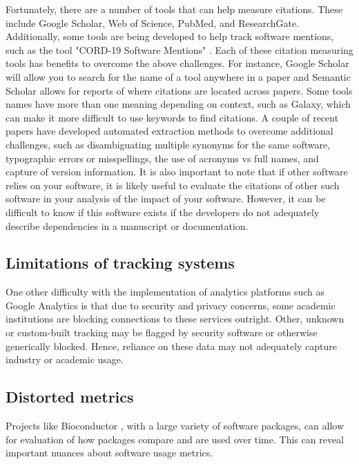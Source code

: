 \documentclass{article}
\begin{document}
Fortunately, there are a number of tools that can help measure citations. These include Google Scholar, Web of Science, PubMed, and ResearchGate. Additionally, some tools are being developed to help track software mentions, such as the tool "CORD-19 Software Mentions" \cite{wade_cord-19_2021}. Each of these citation measuring tools has benefits to overcome the above challenges. For instance, Google Scholar will allow you to search for the name of a tool anywhere in a paper and Semantic Scholar allows for reports of where citations are located across papers. Some tools names have more than one meaning depending on context, such as Galaxy, which can make it more difficult to use keywords to find citations. A couple of recent papers \cite{istrate_large_2022, schindler_role_2022} have developed automated extraction methods to overcome additional challenges, such as disambiguating multiple synonyms for the same software, typographic errors or misspellings, the use of acronyms vs full names, and capture of version information. It is also important to note that if other software relies on your software, it is likely useful to evaluate the citations of other such software in your analysis of the impact of your software. However, it can be difficult to know if this software exists if the developers do not adequately describe dependencies in a manuscript or documentation.

\subsection{Limitations of tracking systems}

One other difficulty with the implementation of analytics platforms such as Google Analytics is that due to security and privacy concerns, some academic institutions are blocking connections to these services outright. Other, unknown or custom-built tracking may be flagged by security software or otherwise generically blocked. Hence, reliance on these data may not adequately capture industry or academic usage.

\subsection{Distorted metrics}

Projects like Bioconductor \cite{bioconductor}, with a large variety of software packages, can allow for evaluation of how packages compare and are used over time. This can reveal important nuances about software usage metrics. 
\end{document}
